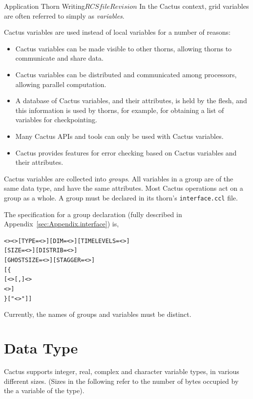 \begin{cactuspart}{Application Thorn Writing}{$RCSfile$}{$Revision$}
In the Cactus context, grid variables are often referred
to simply as \textit{variables}.

Cactus variables are used instead of local variables for a number of reasons:
\begin{itemize}
\item Cactus variables can be made visible to other thorns, allowing
      thorns to communicate and share data.
\item Cactus variables can be distributed and communicated
      among processors, allowing parallel computation.
\item A database of Cactus variables, and their attributes, is held by
      the flesh, and this information is used by thorns, for example, for
      obtaining a list of variables for checkpointing.
\item Many Cactus APIs and tools can only be used with Cactus variables.
\item Cactus provides features for error checking based on Cactus variables
      and their attributes.
\end{itemize}

Cactus variables are collected into \textit{groups}.  All variables in a
group are of the same data type, and have the same attributes. Most Cactus
operations act on a group as a whole.  A group must be declared in its
thorn's \texttt{interface.ccl} file.

The specification for a group declaration
(fully described in Appendix~\ref{sec:Appendix.interface}) is,

\begin{alltt}
<> <> [TYPE=<>] [DIM=<>] [TIMELEVELS=<>]
   [SIZE=<>] [DISTRIB=<>]
   [GHOSTSIZE=<>] [STAGGER=<>]
[\{
 [ <>[,]<>
   <> ]
\} ["<>"] ]
\end{alltt}

Currently, the names of groups and variables must be distinct.


\section{Data Type}

Cactus supports integer, real, complex and character variable types, in
various different sizes.  (Sizes in the following refer to the number of
bytes occupied by the a variable of the type).


\end{cactuspart}
